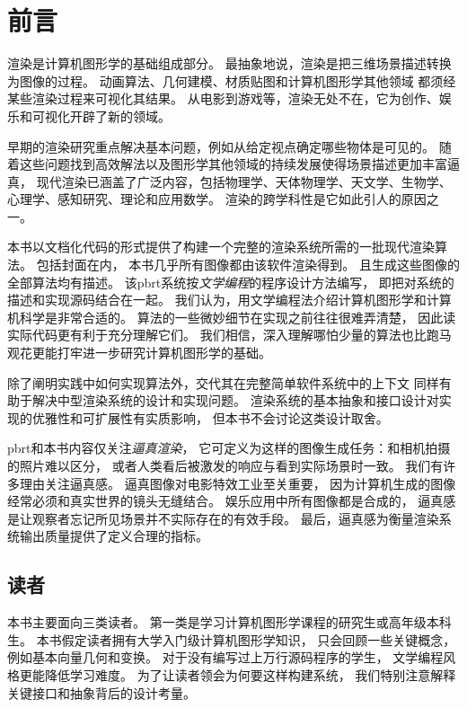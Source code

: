 \chapter{前言}\label{chap:前言}
\setcounter{page}{1}
渲染是计算机图形学的基础组成部分。
最抽象地说，渲染是把三维场景描述转换为图像的过程。
动画算法、几何建模、材质贴图和计算机图形学其他领域
都须经某些渲染过程来可视化其结果。
从电影到游戏等，渲染无处不在，它为创作、娱乐和可视化开辟了新的领域。

早期的渲染研究重点解决基本问题，例如从给定视点确定哪些物体是可见的。
随着这些问题找到高效解法以及图形学其他领域的持续发展使得场景描述更加丰富逼真，
现代渲染已涵盖了广泛内容，包括物理学、天体物理学、天文学、生物学、心理学、感知研究、理论和应用数学。
渲染的跨学科性是它如此引人的原因之一。

本书以文档化代码的形式提供了构建一个完整的渲染系统所需的一批现代渲染算法。
包括封面在内，
本书几乎所有图像都由该软件渲染得到。
且生成这些图像的全部算法均有描述。
该pbrt系统按{\itshape 文学编程}的程序设计方法编写，
即把对系统的描述和实现源码结合在一起。
我们认为，用文学编程法介绍计算机图形学和计算机科学是非常合适的。
算法的一些微妙细节在实现之前往往很难弄清楚，
因此读实际代码更有利于充分理解它们。
我们相信，深入理解哪怕少量的算法也比跑马观花更能打牢进一步研究计算机图形学的基础。

除了阐明实践中如何实现算法外，交代其在完整简单软件系统中的上下文
同样有助于解决中型渲染系统的设计和实现问题。
渲染系统的基本抽象和接口设计对实现的优雅性和可扩展性有实质影响，
但本书不会讨论这类设计取舍。

pbrt和本书内容仅关注{\itshape 逼真渲染}，
它可定义为这样的图像生成任务：和相机拍摄的照片难以区分，
或者人类看后被激发的响应与看到实际场景时一致。
我们有许多理由关注逼真感。
逼真图像对电影特效工业至关重要，
因为计算机生成的图像经常必须和真实世界的镜头无缝结合。
娱乐应用中所有图像都是合成的，
逼真感是让观察者忘记所见场景并不实际存在的有效手段。
最后，逼真感为衡量渲染系统输出质量提供了定义合理的指标。

\section*{读者}\label{sec:读者}

本书主要面向三类读者。
第一类是学习计算机图形学课程的研究生或高年级本科生。
本书假定读者拥有大学入门级计算机图形学知识，
只会回顾一些关键概念，例如基本向量几何和变换。
对于没有编写过上万行源码程序的学生，
文学编程风格更能降低学习难度。
为了让读者领会为何要这样构建系统，
我们特别注意解释关键接口和抽象背后的设计考量。

